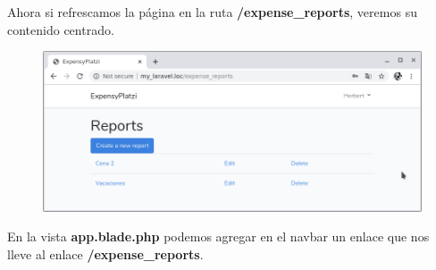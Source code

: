 \documentclass{article}
\begin{document}
Ahora si refrescamos la página en la ruta \textbf{/expense\_reports}, veremos
su contenido centrado.

\newpage

\begin{figure}[h!]
  \centering
  \includegraphics[scale=0.5]{./Pictures/139_container_report.png}
\end{figure}

En la vista \textbf{app.blade.php} podemos agregar en el navbar un enlace que
nos lleve al enlace \textbf{/expense\_reports}.\\
\end{document}
